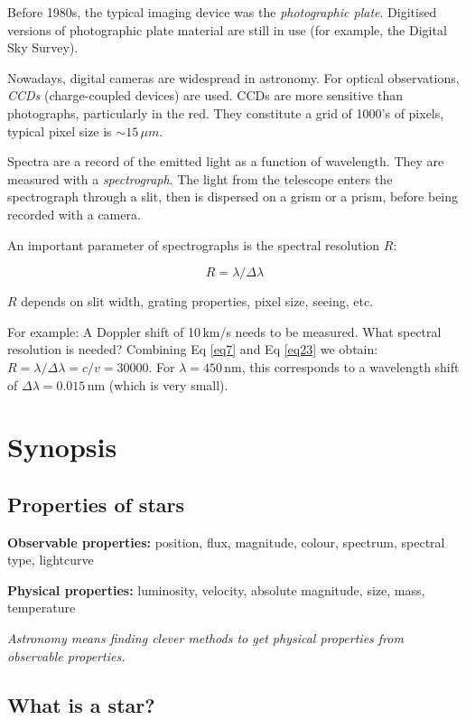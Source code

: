 Before 1980s, the typical imaging device was the \textit{photographic plate}. Digitised versions of photographic plate material are still in use (for example, the Digital Sky Survey).

Nowadays, digital cameras are widespread in astronomy. For optical observations, \textit{CCDs} (charge-coupled devices) are used. CCDs are more sensitive than photographs, particularly in the red. They constitute a grid of 1000's of pixels, typical pixel size is $\sim 15\,\mu m$.

Spectra are a record of the emitted light as a function of wavelength. They are measured with a \textit{spectrograph}. The light from the telescope enters the spectrograph through a slit, then is dispersed on a grism or a prism, before being recorded with a camera.

An important parameter of spectrographs is the spectral resolution $R$:

\begin{equation}
R = \lambda / \Delta\lambda
\label{eq23}
\end{equation}

$R$ depends on slit width, grating properties, pixel size, seeing, etc. 

For example: A Doppler shift of 10\,km/s needs to be measured. What spectral resolution is needed? Combining Eq \ref{eq7} and Eq \ref{eq23} we obtain: $R = \lambda / \Delta\lambda = c / v  = 30000$. For $\lambda = 450$\,nm, this corresponds to a wavelength shift of $\Delta\lambda = 0.015$\,nm (which is very small).

\section{Synopsis}

\subsection{Properties of stars}

\textbf{Observable properties:} position, flux, magnitude, colour, spectrum, spectral type, lightcurve

\textbf{Physical properties:} luminosity, velocity, absolute magnitude, size, mass, temperature

\textit{Astronomy means finding clever methods to get physical properties from observable properties.}

\subsection{What is a star?}


